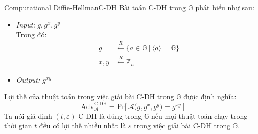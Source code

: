 \documentclass[class=report, crop=false]{standalone}
\begin{document}
		\begin{problem}{Computational Diffie-Hellman}{C-DH}
			Bài toán C-DH trong $\mathbb{G}$ phát biểu như sau:
			\vspace{-\baselineskip}
			\begin{itemize}[leftmargin=1.5cm, itemindent=-0.5cm]
				\item[] \textit{Input:} $g, g^x, g^y$ \\
				Trong đó: \vspace{-\baselineskip}
				\begin{align*}
					g 		&\xleftarrow{R} \{ a \in \mathbb{G}\ | \ \langle a \rangle = \mathbb{G} \} \\
					x, y 	&\xleftarrow{R} \mathbb{Z}_n
				\end{align*}
				\item[] \textit{Output:} $g^{xy}$
			\end{itemize}
			\vspace{-\baselineskip}\par
			Lợi thế của thuật toán \algo trong việc giải bài C-DH trong $\mathbb{G}$ được định nghĩa:
			\[
				\text{Adv}_{\mathcal{A}}^{\text{C-DH}} = \text{Pr}\bigg[ \ \mathcal{A}\Big(g, g^x, g^y \Big) = g^{xy} \ \bigg]
			\] \indent
			Ta nói giả định $(t, \varepsilon)$-C-DH là đúng trong $\mathbb{G}$ nếu mọi thuật toán chạy trong thời gian $t$ đều có lợi thế nhiều nhất là $\varepsilon$ trong việc giải bài C-DH trong $\mathbb{G}$.
		\end{problem}
		\newpage
\end{document}
